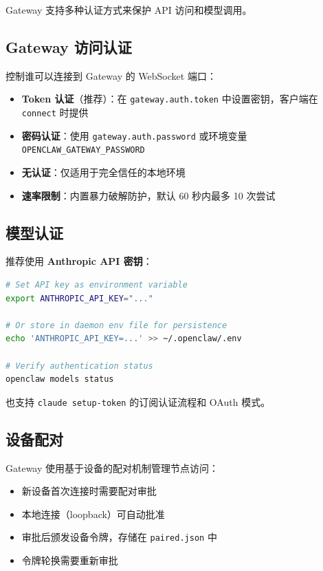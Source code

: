 Gateway 支持多种认证方式来保护 API 访问和模型调用。

\subsection{Gateway 访问认证}

控制谁可以连接到 Gateway 的 WebSocket 端口：

\begin{itemize}
  \item \textbf{Token 认证}（推荐）：在 \texttt{gateway.auth.token} 中设置密钥，客户端在 \texttt{connect} 时提供
  \item \textbf{密码认证}：使用 \texttt{gateway.auth.password} 或环境变量 \texttt{OPENCLAW\_GATEWAY\_PASSWORD}
  \item \textbf{无认证}：仅适用于完全信任的本地环境
  \item \textbf{速率限制}：内置暴力破解防护，默认 60 秒内最多 10 次尝试
\end{itemize}

\subsection{模型认证}

推荐使用 \textbf{Anthropic API 密钥}：

\begin{lstlisting}[language=bash]
# Set API key as environment variable
export ANTHROPIC_API_KEY="..."

# Or store in daemon env file for persistence
echo 'ANTHROPIC_API_KEY=...' >> ~/.openclaw/.env

# Verify authentication status
openclaw models status
\end{lstlisting}

\noindent 也支持 \texttt{claude setup-token} 的订阅认证流程和 OAuth 模式。

\subsection{设备配对}

Gateway 使用基于设备的配对机制管理节点访问：

\begin{itemize}
  \item 新设备首次连接时需要配对审批
  \item 本地连接（loopback）可自动批准
  \item 审批后颁发设备令牌，存储在 \texttt{paired.json} 中
  \item 令牌轮换需要重新审批
\end{itemize}

